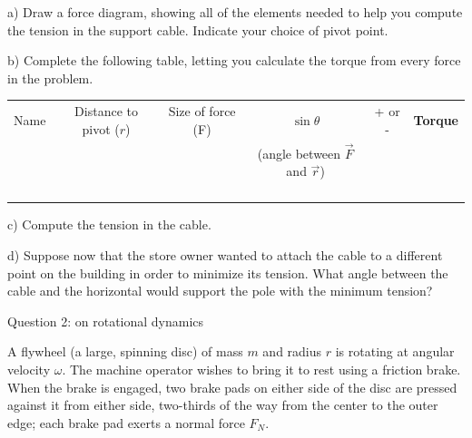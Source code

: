 \documentclass[12pt]{article}
\begin{document}
a) Draw a force diagram, showing all of the elements needed to help you compute the tension in the support cable. Indicate
your choice of pivot point.

\vspace{5in}

\newpage

\begin{landscape}

b) Complete the following table, letting you calculate the torque from every force in the problem. 

\Large
\begin{center}
\begin{tabular}{|c|c|c|c|c|c|}
\hline
Name & Distance to pivot ($r$) & Size of force (F) & $\sin \theta$ & + or - & {\bf Torque} \\
     & & & (angle between $\vec F$ and $\vec r$) & & \\\hline
              &                         &                        &                                              &                    &                               \\ \hline
              &                         &                        &                                              &                    &                               \\ \hline
              &                         &                        &                                              &                    &                               \\ \hline
              &                         &                        &                                              &                    &                               \\ \hline
\end{tabular}
\end{center}
\normalsize
c) Compute the tension in the cable.

\vspace{3 in}

d) Suppose now that the store owner wanted to attach the cable to a different point on the building in order to minimize its tension. What angle between the
cable and the horizontal would support the pole with the minimum tension?
\end{landscape} \newpage

\centerline{\large Question 2: on rotational dynamics}
A flywheel (a large, spinning disc) of mass $m$ and radius $r$ is rotating
at angular velocity $\omega$. The machine operator wishes to bring it to rest using a friction brake. When the brake
is engaged, two brake pads on either side of the disc are pressed against it from either side, two-thirds
of the way from the center to the outer edge; each brake pad
exerts a normal force $F_N$.
\end{document}
